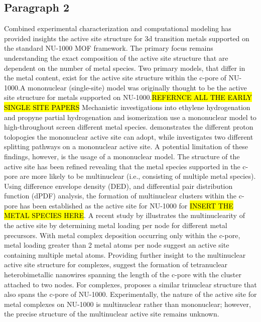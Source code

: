 \documentclass[journal=jctcce,manuscript=article]{achemso}
\begin{document}
\subsection{Paragraph 2}
Combined experimental characterization and computational modeling has provided insights the active site structure for 3d transition metals supported on the standard NU-1000 MOF framework. The primary focus remains understanding the exact composition of the active site structure that are dependent on the number of metal species. Two primary models, that differ in the metal content, exist for the active site structure within the c-pore of NU-1000.A mononuclear (single-site) model was originally thought to be the active site structure for metals supported on NU-1000.\hl{REFERNCE ALL THE EARLY SINGLE SITE PAPERS} Mechanistic investigations into ethylene hydrogenation\cite{Shabbir2020} and propyne partial hydrogenation and isomerization\cite{Hackler2020} use a mononuclear model to high-throughout screen different metal species. \citeauthor{Shabbir2020} demonstrates the different proton tolopogies the mononuclear active site can adopt,\cite{Shabbir2020} while \citeauthor{Hackler2020} investigates two different  splitting pathways on a mononuclear active site.\citeauthor{Hackler2020} A potential limitation of these findings, however, is the usage of a mononuclear model. The structure of the active site has been refined revealing that the metal species supported in the c-pore are more likely to be multinuclear (i.e., consisting of multiple metal species). Using difference envelope density (DED),\cite{Li2017} and differential pair distribution function (dPDF) analysis,\cite{PlateroPrats2017} the formation of multinuclear clusters within the c-pore has been established as the active site for NU-1000 for \hl{INSERT THE METAL SPECIES HERE}. A recent study by \citeauthor{Kim2020}  illustrates the multinuclearity of the active site by determining metal loading per node for different metal precursors.\cite{Kim2020} With metal complex deposition occurring only within the c-pore, metal loading greater than 2 metal atoms per node suggest an active site containing multiple metal atoms. Providing further insight to the multinuclear active site structure for  complexes, \citeauthor{PlateroPrats2017} suggest the formation of tetranuclear heterobimetallic nanowires spanning the length of the c-pore with the cluster attached to two nodes.\citeauthor{PlateroPrats2017} For  complexes, \citeauthor{Ikuno2017} proposes a similar trinuclear structure that also spans the c-pore of NU-1000. Experimentally, the nature of the active site for metal complexes on NU-1000 is multinuclear rather than mononuclear; however, the precise structure of the multinuclear active site remains unknown. 
\end{document}
